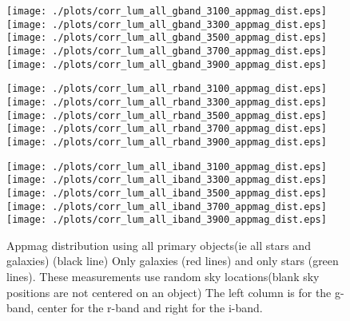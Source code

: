 \documentclass[10pt]{article}
\begin{document}
\begin{figure}
\centering
\begin{minipage}{0.32\textwidth}
 \texttt{[image: ./plots/corr\_lum\_all\_gband\_3100\_appmag\_dist.eps]}
 \texttt{[image: ./plots/corr\_lum\_all\_gband\_3300\_appmag\_dist.eps]}
 \texttt{[image: ./plots/corr\_lum\_all\_gband\_3500\_appmag\_dist.eps]}
 \texttt{[image: ./plots/corr\_lum\_all\_gband\_3700\_appmag\_dist.eps]}
 \texttt{[image: ./plots/corr\_lum\_all\_gband\_3900\_appmag\_dist.eps]}
\end{minipage}
 \begin{minipage}{0.32\textwidth}
 \texttt{[image: ./plots/corr\_lum\_all\_rband\_3100\_appmag\_dist.eps]}
 \texttt{[image: ./plots/corr\_lum\_all\_rband\_3300\_appmag\_dist.eps]}
 \texttt{[image: ./plots/corr\_lum\_all\_rband\_3500\_appmag\_dist.eps]}
 \texttt{[image: ./plots/corr\_lum\_all\_rband\_3700\_appmag\_dist.eps]}
 \texttt{[image: ./plots/corr\_lum\_all\_rband\_3900\_appmag\_dist.eps]}
\end{minipage}
\begin{minipage}{0.32\textwidth}
 \texttt{[image: ./plots/corr\_lum\_all\_iband\_3100\_appmag\_dist.eps]}
 \texttt{[image: ./plots/corr\_lum\_all\_iband\_3300\_appmag\_dist.eps]}
 \texttt{[image: ./plots/corr\_lum\_all\_iband\_3500\_appmag\_dist.eps]}
 \texttt{[image: ./plots/corr\_lum\_all\_iband\_3700\_appmag\_dist.eps]}
 \texttt{[image: ./plots/corr\_lum\_all\_iband\_3900\_appmag\_dist.eps]}
\end{minipage}
\caption{Appmag distribution using all primary objects(ie all stars and galaxies) (black line) 
Only galaxies (red lines) and only stars (green lines).
These measurements use random sky locations(blank sky positions are not centered on an object)
The left column is for the g-band, center for the r-band and right for the i-band.
}
\end{figure}
\end{document}
